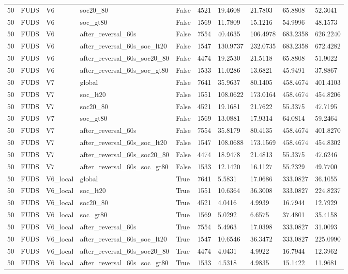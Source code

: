 \begin{tabular}{llllllllll}
50 & FUDS & V6 & soc20\_80 & False & 4521 & 19.4608 & 21.7803 & 65.8808 & 52.3041 \\
50 & FUDS & V6 & soc\_gt80 & False & 1569 & 11.7809 & 15.1216 & 54.9996 & 48.1573 \\
50 & FUDS & V6 & after\_reversal\_60s & False & 7554 & 40.4635 & 106.4978 & 683.2358 & 626.2240 \\
50 & FUDS & V6 & after\_reversal\_60s\_soc\_lt20 & False & 1547 & 130.9737 & 232.0735 & 683.2358 & 672.4282 \\
50 & FUDS & V6 & after\_reversal\_60s\_soc20\_80 & False & 4474 & 19.2530 & 21.5118 & 65.8808 & 51.9022 \\
50 & FUDS & V6 & after\_reversal\_60s\_soc\_gt80 & False & 1533 & 11.0286 & 13.6821 & 45.9491 & 37.8867 \\
50 & FUDS & V7 & global & False & 7641 & 35.9637 & 80.1405 & 458.4674 & 401.4103 \\
50 & FUDS & V7 & soc\_lt20 & False & 1551 & 108.0622 & 173.0164 & 458.4674 & 454.8206 \\
50 & FUDS & V7 & soc20\_80 & False & 4521 & 19.1681 & 21.7622 & 55.3375 & 47.7195 \\
50 & FUDS & V7 & soc\_gt80 & False & 1569 & 13.0881 & 17.9314 & 64.0814 & 59.2464 \\
50 & FUDS & V7 & after\_reversal\_60s & False & 7554 & 35.8179 & 80.4135 & 458.4674 & 401.8270 \\
50 & FUDS & V7 & after\_reversal\_60s\_soc\_lt20 & False & 1547 & 108.0688 & 173.1569 & 458.4674 & 454.8302 \\
50 & FUDS & V7 & after\_reversal\_60s\_soc20\_80 & False & 4474 & 18.9478 & 21.4813 & 55.3375 & 47.6246 \\
50 & FUDS & V7 & after\_reversal\_60s\_soc\_gt80 & False & 1533 & 12.1420 & 16.1127 & 55.2329 & 49.7700 \\
50 & FUDS & V6\_local & global & True & 7641 & 5.5831 & 17.0686 & 333.0827 & 36.1055 \\
50 & FUDS & V6\_local & soc\_lt20 & True & 1551 & 10.6364 & 36.3008 & 333.0827 & 224.8237 \\
50 & FUDS & V6\_local & soc20\_80 & True & 4521 & 4.0416 & 4.9939 & 16.7944 & 12.7929 \\
50 & FUDS & V6\_local & soc\_gt80 & True & 1569 & 5.0292 & 6.6575 & 37.4801 & 35.4158 \\
50 & FUDS & V6\_local & after\_reversal\_60s & True & 7554 & 5.4963 & 17.0398 & 333.0827 & 31.0093 \\
50 & FUDS & V6\_local & after\_reversal\_60s\_soc\_lt20 & True & 1547 & 10.6546 & 36.3472 & 333.0827 & 225.0990 \\
50 & FUDS & V6\_local & after\_reversal\_60s\_soc20\_80 & True & 4474 & 4.0431 & 4.9922 & 16.7944 & 12.3962 \\
50 & FUDS & V6\_local & after\_reversal\_60s\_soc\_gt80 & True & 1533 & 4.5318 & 4.9835 & 15.1422 & 11.9681 \\
\hline
\end{tabular}
